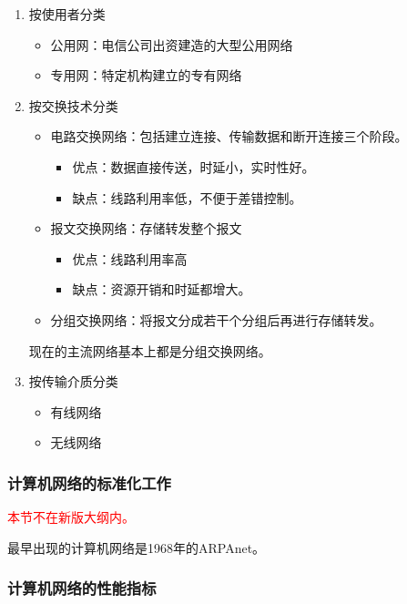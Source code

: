 \documentclass[12pt, a4paper, oneside]{ctexart}
\begin{document}
\begin{enumerate}
\begin{figure}
    \end{figure}
    \item 按使用者分类
    \begin{itemize}
        \item 公用网：电信公司出资建造的大型公用网络
        \item 专用网：特定机构建立的专有网络
    \end{itemize}
    \item 按交换技术分类
    \begin{itemize}
        \item 电路交换网络：包括建立连接、传输数据和断开连接三个阶段。
        \begin{itemize}
            \item 优点：数据直接传送，时延小，实时性好。
            \item 缺点：线路利用率低，不便于差错控制。
        \end{itemize}
        \item 报文交换网络：存储转发整个报文
        \begin{itemize}
            \item 优点：线路利用率高
            \item 缺点：资源开销和时延都增大。
        \end{itemize}
        \item 分组交换网络：将报文分成若干个分组后再进行存储转发。
    \end{itemize}
    现在的主流网络基本上都是分组交换网络。
    \item 按传输介质分类
    \begin{itemize}
        \item 有线网络
        \item 无线网络
    \end{itemize}
\end{enumerate}

\subsubsection{计算机网络的标准化工作}

\textcolor{red}{本节不在新版大纲内。}

最早出现的计算机网络是1968年的ARPAnet。

\subsubsection{计算机网络的性能指标}
\label{performance_index}
\end{document}
